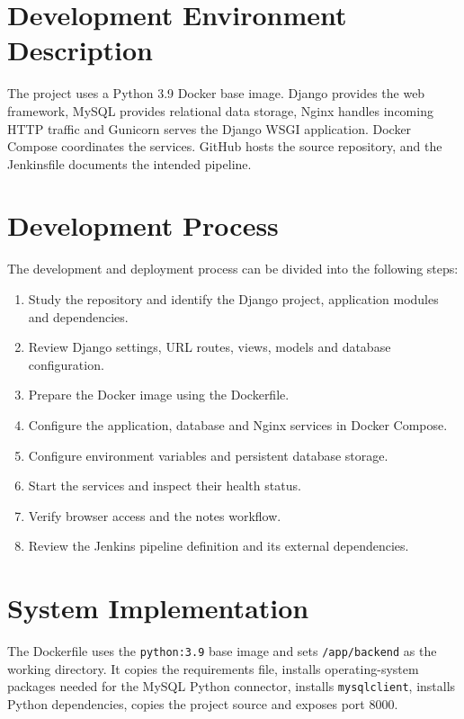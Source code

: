 \documentclass[12pt,a4paper,oneside]{report}
\begin{document}
\section{Development Environment Description}
The project uses a Python 3.9 Docker base image. Django provides the web framework, MySQL provides relational data storage, Nginx handles incoming HTTP traffic and Gunicorn serves the Django WSGI application. Docker Compose coordinates the services. GitHub hosts the source repository, and the Jenkinsfile documents the intended pipeline.

\section{Development Process}
The development and deployment process can be divided into the following steps:
\begin{enumerate}[leftmargin=0.4in]
\item Study the repository and identify the Django project, application modules and dependencies.
\item Review Django settings, URL routes, views, models and database configuration.
\item Prepare the Docker image using the Dockerfile.
\item Configure the application, database and Nginx services in Docker Compose.
\item Configure environment variables and persistent database storage.
\item Start the services and inspect their health status.
\item Verify browser access and the notes workflow.
\item Review the Jenkins pipeline definition and its external dependencies.
\end{enumerate}

\section{System Implementation}
The Dockerfile uses the \texttt{python:3.9} base image and sets \texttt{/app/backend} as the working directory. It copies the requirements file, installs operating-system packages needed for the MySQL Python connector, installs \texttt{mysqlclient}, installs Python dependencies, copies the project source and exposes port 8000.
\end{document}
